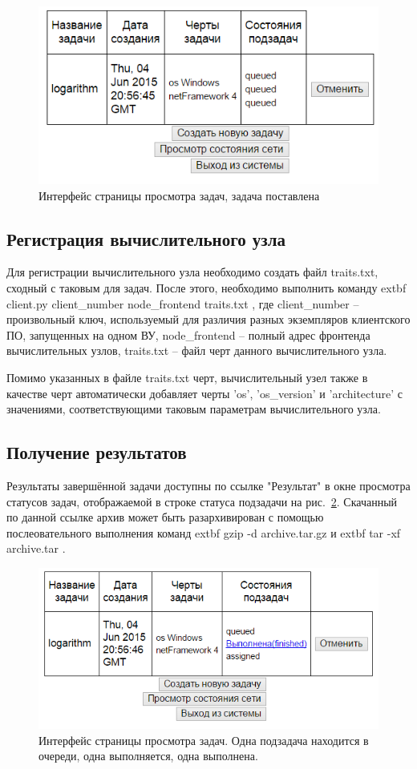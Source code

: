 \documentclass[a4paper,12pt]{report}
\numberwithin{equation}{section}
\begin{document}
  \begin{figure}
    \centering
    \includegraphics[width=.49\linewidth]{img/interface/tasks-created}
    \caption{Интерфейс страницы просмотра задач, задача поставлена}
    \label{fig:interface-tasks-created}
  \end{figure}  
  
  \subsection{Регистрация вычислительного узла}
  Для регистрации вычислительного узла необходимо создать файл traits.txt, сходный с таковым для задач. 
  После этого, необходимо выполнить команду  
  extbf{ client.py client\_number node\_frontend traits.txt }
  , где client\_number -- произвольный ключ, используемый для различия разных экземпляров клиентского ПО, запущенных на одном ВУ,
  node\_frontend -- полный адрес фронтенда вычислительных узлов,
  traits.txt -- файл черт данного вычислительного узла.
  
  Помимо указанных в файле traits.txt черт, вычислительный узел также в качестве черт автоматически добавляет 
  черты 'os', 'os\_version' и 'architecture' с значениями, соответствующими таковым параметрам вычислительного узла.
  
  \subsection{Получение результатов}
  Результаты завершённой задачи доступны по ссылке "Результат" в окне просмотра статусов задач, отображаемой в строке статуса подзадачи на рис.~\ref{fig:interface-tasks-partial}.
  Скачанный по данной ссылке архив может быть разархивирован с помощью послеовательного выполнения команд
  extbf{ gzip -d archive.tar.gz } и 
  extbf{ tar -xf archive.tar }.     
  
  \begin{figure}
    \centering
    \includegraphics[width=.49\linewidth]{img/interface/tasks-partial}
    \caption{Интерфейс страницы просмотра задач. Одна подзадача находится в очереди, одна выполняется, одна выполнена.}
    \label{fig:interface-tasks-partial}
  \end{figure}  
  
\end{document}
